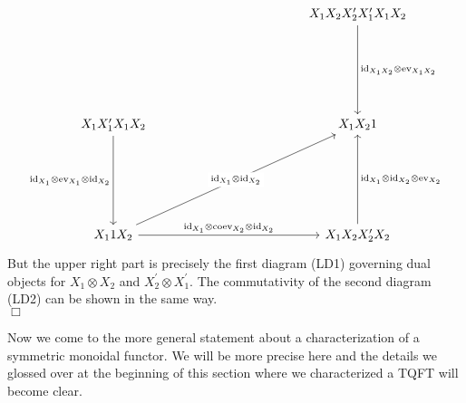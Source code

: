 \begin{prf}[Sketch]
\begin{equation*}
\begin{tikzcd}[row sep=7em,column sep=6em]
  &
  &
  X_{1} X_{2} X_{2}^{\prime} X_{1}^{\prime} X_{1} X_{2}
  \ar{d}{\mathrm{id}_{X_{1} X_{2}} \otimes \mathrm{ev}_{X_{1} X_{2}}}
  \\
  X_{1} X_{1}^{\prime} X_{1} X_{2}
  \ar{d}[swap]{\mathrm{id}_{X_{1}} \otimes \mathrm{ev}_{X_{1}} \otimes \mathrm{id}_{X_{2}}}
  &
  &
  X_{1} X_{2} 1
  \\
  X_{1} 1 X_{2}
  \ar{urr}[description]{\mathrm{id}_{X_{1}} \otimes \mathrm{id}_{X_{2}}}
  \ar{rr}{\mathrm{id}_{X_{1}} \otimes \mathrm{coev}_{X_{2}} \otimes \mathrm{id}_{X_{2}}}
  &
  &
  X_{1} X_{2} X_{2}^{\prime} X_{2}
  \ar{u}[swap]{\mathrm{id}_{X_{1}} \otimes \mathrm{id}_{X_{2}} \otimes \mathrm{ev}_{X_{2}}}
\end{tikzcd}
\end{equation*}
But the upper right part is precisely the first diagram (LD1) governing dual objects for $X_{1} \otimes X_{2}$ and $X_{2}^{\prime} \otimes X_{1}^{\prime}$. The commutativity of the second diagram (LD2) can be shown in the same way.
\\
\phantom{proven}
\hfill
$\Box$
\end{prf}
Now we come to the more general statement about a characterization of a symmetric monoidal functor. We will be more precise here and the details we glossed over at the beginning of this section where we characterized a TQFT will become clear.
\\

